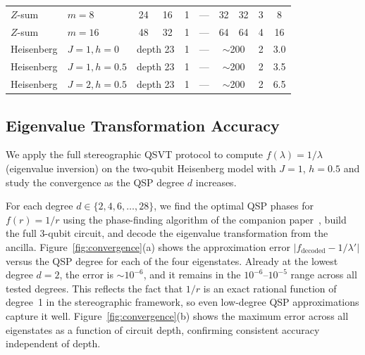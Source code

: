 \begin{table}
\begin{ruledtabular}
\begin{tabular}{llcccccccc}
			$Z$-sum    & $m=8$           & 24                                & 16                                  & 1      & ---                           & 32   & 32  & 3      & 8        \\
			$Z$-sum    & $m=16$          & 48                                & 32                                  & 1      & ---                           & 64   & 64  & 4      & 16       \\
			Heisenberg & $J{=}1,h{=}0$   & \multicolumn{2}{c}{depth 23}      & 1                                   & ---    & \multicolumn{2}{c}{$\sim$200} & 2    & 3.0                     \\
			Heisenberg & $J{=}1,h{=}0.5$ & \multicolumn{2}{c}{depth 23}      & 1                                   & ---    & \multicolumn{2}{c}{$\sim$200} & 2    & 3.5                     \\
			Heisenberg & $J{=}2,h{=}0.5$ & \multicolumn{2}{c}{depth 23}      & 1                                   & ---    & \multicolumn{2}{c}{$\sim$200} & 2    & 6.5                     \\
		\end{tabular}
	\end{ruledtabular}
\end{table}

\subsection{Eigenvalue Transformation Accuracy}
\label{subsec:transform-accuracy}

We apply the full stereographic QSVT protocol to compute
$f(\lambda) = 1/\lambda$ (eigenvalue inversion) on the
two-qubit Heisenberg model with $J = 1$, $h = 0.5$ and
study the convergence as the QSP degree $d$ increases.

For each degree $d \in \{2, 4, 6, \ldots, 28\}$, we find
the optimal QSP phases for $f(r) = 1/r$ using the
phase-finding algorithm of the companion
paper~\cite{KharaziLeytonOrtega2026a}, build the full
3-qubit circuit, and decode the eigenvalue transformation
from the ancilla.
Figure~\ref{fig:convergence}(a) shows the approximation
error $|f_{\mathrm{decoded}} - 1/\lambda'|$ versus the
QSP degree for each of the four eigenstates.  Already at
the lowest degree $d = 2$, the error is $\sim\!10^{-6}$,
and it remains in the $10^{-6}$--$10^{-5}$ range across all
tested degrees.  This reflects the fact that $1/r$ is an
exact rational function of degree~1 in the stereographic
framework, so even low-degree QSP approximations capture it
well.
Figure~\ref{fig:convergence}(b) shows the maximum error
across all eigenstates as a function of circuit depth,
confirming consistent accuracy independent of depth.


